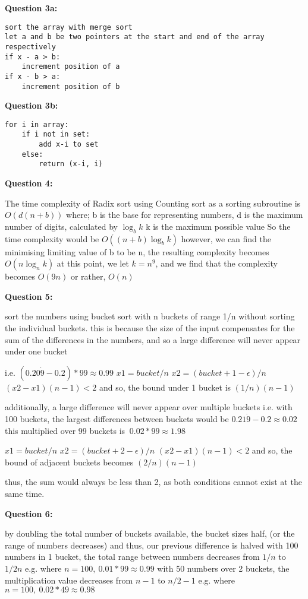 \documentclass{article}
\begin{document}
\textbf{Question 3a:}

\begin{verbatim}
sort the array with merge sort
let a and b be two pointers at the start and end of the array respectively
if x - a > b:
    increment position of a
if x - b > a:
    increment position of b
\end{verbatim}

\textbf{Question 3b:}

\begin{verbatim}
for i in array:
    if i not in set:
        add x-i to set
    else:
        return (x-i, i)
\end{verbatim}

\textbf{Question 4:}

The time complexity of Radix sort using Counting sort as a sorting subroutine is \(O(d(n+b))\) where;
b is the base for representing numbers,
d is the maximum number of digits, calculated by \(\log_b k\)
k is the maximum possible value
So the time complexity would be \(O((n+b)\log_b k)\)
however, we can find the minimising limiting value of b to be n, the resulting complexity becomes \(O(n \log_n k)\)
at this point, we let \(k = n^9\), and we find that the complexity becomes \(O(9n)\) or rather, \(O(n)\)

\textbf{Question 5:}

sort the numbers using bucket sort with n buckets of range 1/n without sorting the individual buckets.
this is because the size of the input compensates for the sum of the differences in the numbers, and so a large difference will never appear under one bucket

i.e. \((0.20\dot{9}-0.2)*99 \approx 0.99\)
\(x1 = bucket / n\)
\(x2 = (bucket + 1 - \epsilon) / n\)
\((x2 - x1)(n-1) < 2\)
and so, the bound under 1 bucket is \((1/n)(n-1)\)

additionally, a large difference will never appear over multiple buckets
i.e. with 100 buckets, the largest differences between buckets would be \(0.21\dot{9} - 0.2 \approx 0.02\)
this multiplied over 99 buckets is \(~0.02 * 99 \approx 1.98\)

\(x1 = bucket / n\)
\(x2 = (bucket + 2 - \epsilon) / n\)
\((x2 - x1)(n-1) < 2\)
and so, the bound of adjacent buckets becomes \((2/n)(n-1)\)

thus, the sum would always be less than 2, as both conditions cannot exist at the same time.


\textbf{Question 6:}

by doubling the total number of buckets available, the bucket sizes half, (or the range of numbers decreases)
and thus, our previous difference is halved
with 100 numbers in 1 bucket, the total range between numbers decreases from \(1/n\) to \(1/2n\)
e.g. where \(n = 100, ~0.01 * 99 \approx 0.99\)
with 50 numbers over 2 buckets, the multiplication value decreases from \(n-1\) to \(n/2-1\)
e.g. where \(n = 100, ~0.02 * 49 \approx 0.98\)
\end{document}
